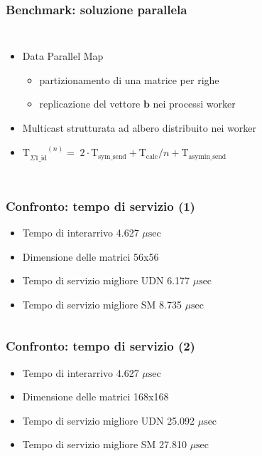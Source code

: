 \documentclass{beamer}
\newcommand{\musec}{$\mu \textrm{sec}$}
\newcommand{\inTsubsystemId}{\mathrm{T}_{\Sigma1\mathrm{\_id}}^{\phantom{\Sigma1\_id}(n)}}
\newcommand{\inTcalc}{\mathrm{T}_{\mathrm{calc}}}
\newcommand{\inTsymsend}{\mathrm{T}_{\textrm{sym\_send}}}
\newcommand{\inTasyminsend}{\mathrm{T}_{\textrm{asymin\_send}}}
\begin{document}
\begin{frame}
  \frametitle{Benchmark: soluzione parallela}
  \begin{columns}[c]
    \begin{itemize}
\item Data Parallel Map
  \begin{itemize}
  \item partizionamento di una matrice per righe
  \item replicazione del vettore $\mathbf{b}$ nei processi worker
  \end{itemize}
\item Multicast strutturata ad albero distribuito nei worker
\item $\inTsubsystemId = \; 2 \cdot \inTsymsend + \inTcalc / n + \inTasyminsend$
\end{itemize}
  \begin{figure}
  \end{figure}  

  \end{columns}
\end{frame}

\begin{frame}
  \frametitle{Confronto: tempo di servizio (1)}
  \begin{itemize}
  \item Tempo di interarrivo 4.627 \musec
  \item Dimensione delle matrici 56x56
  \item Tempo di servizio migliore UDN 6.177 \musec
  \item Tempo di servizio migliore SM 8.735 \musec
  \end{itemize}
  \begin{columns}
    \resizebox{\columnwidth}{!}{}
    \resizebox{\columnwidth}{!}{}
  \end{columns}
\end{frame}

\begin{frame}
  \frametitle{Confronto: tempo di servizio (2)}
  \begin{itemize}
  \item Tempo di interarrivo 4.627 \musec %
  \item Dimensione delle matrici 168x168
  \item Tempo di servizio migliore UDN 25.092 \musec
  \item Tempo di servizio migliore SM 27.810 \musec  
  \end{itemize}
  \begin{columns}
    \resizebox{\columnwidth}{!}{}
    \resizebox{\columnwidth}{!}{}
  \end{columns}
\end{frame}
\end{document}
